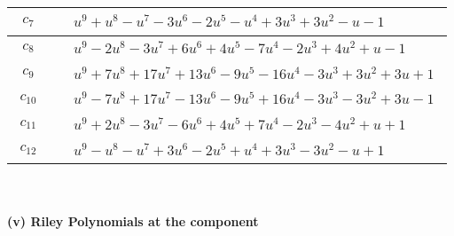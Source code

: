 \documentclass[1p]{elsarticle_modified}
\theoremstyle{definition}
\begin{document}
\begin{tabular}{m{50pt}|m{274pt}}
\hline $$\begin{aligned}c_{7}\end{aligned}$$&$\begin{aligned}
&u^9+u^8- u^7-3 u^6-2 u^5- u^4+3 u^3+3 u^2- u-1
\end{aligned}$\\
\hline $$\begin{aligned}c_{8}\end{aligned}$$&$\begin{aligned}
&u^9-2 u^8-3 u^7+6 u^6+4 u^5-7 u^4-2 u^3+4 u^2+u-1
\end{aligned}$\\
\hline $$\begin{aligned}c_{9}\end{aligned}$$&$\begin{aligned}
&u^9+7 u^8+17 u^7+13 u^6-9 u^5-16 u^4-3 u^3+3 u^2+3 u+1
\end{aligned}$\\
\hline $$\begin{aligned}c_{10}\end{aligned}$$&$\begin{aligned}
&u^9-7 u^8+17 u^7-13 u^6-9 u^5+16 u^4-3 u^3-3 u^2+3 u-1
\end{aligned}$\\
\hline $$\begin{aligned}c_{11}\end{aligned}$$&$\begin{aligned}
&u^9+2 u^8-3 u^7-6 u^6+4 u^5+7 u^4-2 u^3-4 u^2+u+1
\end{aligned}$\\
\hline $$\begin{aligned}c_{12}\end{aligned}$$&$\begin{aligned}
&u^9- u^8- u^7+3 u^6-2 u^5+u^4+3 u^3-3 u^2- u+1
\end{aligned}$\\
\hline
\end{tabular}\\~\\
\newpage\renewcommand{\arraystretch}{1}
\flushleft \textbf{(v) Riley Polynomials at the component}\newline \\
\end{document}
